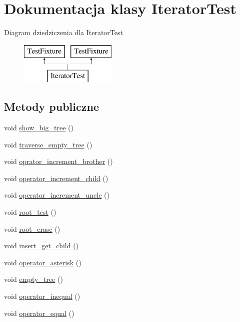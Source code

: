 \hypertarget{class_iterator_test}{}\section{Dokumentacja klasy Iterator\+Test}
\label{class_iterator_test}
Diagram dziedziczenia dla Iterator\+Test\begin{figure}[H]
\begin{center}
\leavevmode
\includegraphics[height=2.000000cm]{class_iterator_test}
\end{center}
\end{figure}
\subsection*{Metody publiczne}
\begin{DoxyCompactItemize}
\item 
void \hyperlink{class_iterator_test_aa784f81f7305266da516fb9c91760442}{show\+\_\+big\+\_\+tree} ()
\item 
void \hyperlink{class_iterator_test_a4b9f01849936bbe2fb2d8307b13a8a24}{traverse\+\_\+empty\+\_\+tree} ()
\item 
void \hyperlink{class_iterator_test_a3345cdda3230924d692933e2fa9ed348}{oprator\+\_\+increment\+\_\+brother} ()
\item 
void \hyperlink{class_iterator_test_abd29dbcdc2be56c9e2d2185b07bb4a6e}{operator\+\_\+increment\+\_\+child} ()
\item 
void \hyperlink{class_iterator_test_a72553c8a4a8fd93ae2c534e4a053325a}{operator\+\_\+increment\+\_\+uncle} ()
\item 
void \hyperlink{class_iterator_test_a9a97bde928f26d4482c1f422dff08b1e}{root\+\_\+test} ()
\item 
void \hyperlink{class_iterator_test_a4defa697edd8ac31231e2f437f5b01e5}{root\+\_\+erase} ()
\item 
void \hyperlink{class_iterator_test_a12ba95e8b8465d2378afd5db43efc6e5}{insert\+\_\+get\+\_\+child} ()
\item 
void \hyperlink{class_iterator_test_a7b80412e084b4a4502daddba5102e3c5}{operator\+\_\+asterisk} ()
\item 
void \hyperlink{class_iterator_test_a826f30ef86193414b8ceb03e76592b37}{empty\+\_\+tree} ()
\item 
void \hyperlink{class_iterator_test_acd1cdaec5c6d5a2b183bbb8dbd979c2a}{operator\+\_\+inequal} ()
\item 
void \hyperlink{class_iterator_test_a4bd66d05af2e1fc6c3d7850ccc7ac783}{operator\+\_\+equal} ()
\end{DoxyCompactItemize}
